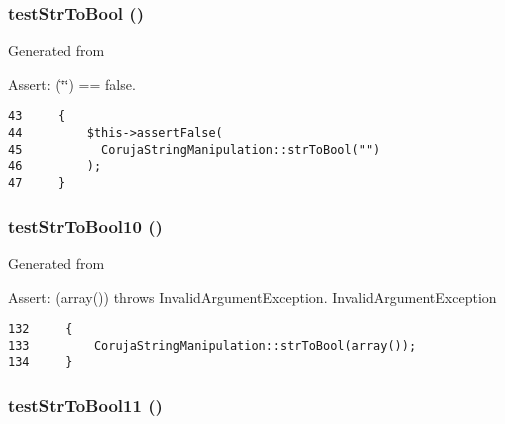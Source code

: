 \hypertarget{class_coruja_string_manipulation_test_6ba9d3e266cdfc669d7904795602db0d}{
\subsubsection[{testStrToBool}]{\setlength{\rightskip}{0pt plus 5cm}testStrToBool ()}}
\label{class_coruja_string_manipulation_test_6ba9d3e266cdfc669d7904795602db0d}


Generated from \begin{Desc}
\item[Assert:](\char`\"{}\char`\"{}) == false. \end{Desc}


\begin{Code}\begin{verbatim}43     {
44         $this->assertFalse(
45           CorujaStringManipulation::strToBool("")
46         );
47     }
\end{verbatim}
\end{Code}


\hypertarget{class_coruja_string_manipulation_test_68caed8655cf92e49e562fc00625b76e}{
\subsubsection[{testStrToBool10}]{\setlength{\rightskip}{0pt plus 5cm}testStrToBool10 ()}}
\label{class_coruja_string_manipulation_test_68caed8655cf92e49e562fc00625b76e}


Generated from \begin{Desc}
\item[Assert:](array()) throws InvalidArgumentException.  InvalidArgumentException \end{Desc}


\begin{Code}\begin{verbatim}132     {
133         CorujaStringManipulation::strToBool(array());
134     }
\end{verbatim}
\end{Code}


\hypertarget{class_coruja_string_manipulation_test_5ebaf5984de13c29f0171a270686bb51}{
\subsubsection[{testStrToBool11}]{\setlength{\rightskip}{0pt plus 5cm}testStrToBool11 ()}}
\label{class_coruja_string_manipulation_test_5ebaf5984de13c29f0171a270686bb51}


